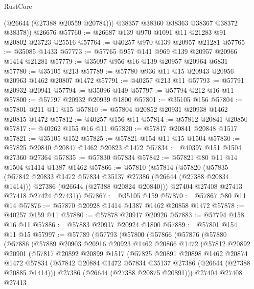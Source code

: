 \begin{lexlean}{RustCore}
\begin{coremodule}
          (@26644 (@27388 @20559 @20784)))
        @38357
        @38360
        @38363
        @38367
        @38372
        @38378))
    @26676
@57760 := @26687 @139 @970 @1091 @11 @21283 @91 @20802 @23723 @25516
@57764 := @40257 @970 @139 @20957 @21281
@57765 := @35085 @1433
@57773 := @57765 @957 @141 @969 @139 @20957 @20966 @1414 @21281
@57779 := @35097 @956 @16 @139 @20957 @20964 @6831
@57780 := @35105 @213
@57789 := @57780 @936 @11 @15 @20943 @20956 @20963 @1462 @20807 @1472
@57791 := @40257 @213 @11
@57793 := @57791 @20932 @20941
@57794 := @35096 @149
@57797 := @57794 @212 @16 @11
@57800 := @57797 @20932 @20939 @1800
@57801 := @35105 @156
@57804 := @57801 @211 @11 @15
@57810 := @57804 @20852 @20931 @20938 @1462 @20815 @1472
@57812 := @40257 @156 @11
@57814 := @57812 @20841 @20850
@57817 := @40262 @155 @16 @11
@57820 := @57817 @20841 @20848 @1517
@57821 := @35105 @152
@57825 := @57821 @154 @11 @15 @1504
@57830 := @57825 @20840 @20847 @1462 @20823 @1472
@57834 := @40397 @151 @1504 @27360 @27364
@57835 := @57830 @57834
@57842 := @57821 @80 @11 @14 @1504 @1414 @1387 @1462
@57866 := @57810
    (@57814
      (@57820
        (@57835
          (@57842 @20833 @1472 @57834 @35137 @27386 (@26644 (@27388 @20834 @1414)))
          @27386
          (@26644 (@27388 @20824 @20840)))
        @27404
        @27408
        @27413
        @27418
        @27424
        @27431))
@57867 := @35105 @159
@57870 := @57867 @80 @11 @14
@57876 := @57870 @20928 @1414 @1387 @1462 @20858 @1472
@57878 := @40257 @159 @11
@57880 := @57878 @20917 @20926
@57883 := @57794 @158 @16 @11
@57886 := @57883 @20917 @20924 @1800
@57889 := @57801 @154 @11 @15
@57997 := @57789
    (@57793
      (@57800
        (@57866
          (@57876
            (@57880
              (@57886
                (@57889
                  @20903
                  @20916
                  @20923
                  @1462
                  @20866
                  @1472
                  (@57812
                    @20892
                    @20901
                    (@57817
                      @20892
                      @20899
                      @1517
                      (@57825
                        @20891
                        @20898
                        @1462
                        @20874
                        @1472
                        @57834
                        (@57842 @20884 @1472 @57834 @35137 @27386 (@26644 (@27388 @20885 @1414)))
                        @27386
                        (@26644 (@27388 @20875 @20891)))
                      @27404
                      @27408
                      @27413

\end{coremodule}
\end{lexlean}
